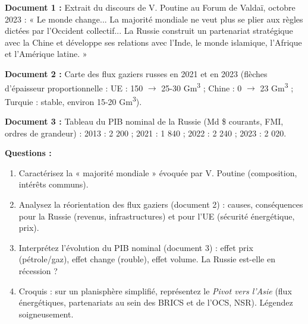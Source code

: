 \documentclass[11pt]{article}
\begin{document}
\begin{exercice}
\textbf{Document 1 :} Extrait du discours de V. Poutine au Forum de Valdaï, octobre 2023 : « Le monde change... La majorité mondiale ne veut plus se plier aux règles dictées par l'Occident collectif... La Russie construit un partenariat stratégique avec la Chine et développe ses relations avec l'Inde, le monde islamique, l'Afrique et l'Amérique latine. »

\textbf{Document 2 :} Carte des flux gaziers russes en 2021 et en 2023 (flèches d'épaisseur proportionnelle : UE : 150 $\rightarrow$ 25-30 Gm\textsuperscript{3} ; Chine : 0 $\rightarrow$ 23 Gm\textsuperscript{3} ; Turquie : stable, environ 15-20 Gm\textsuperscript{3}).

\textbf{Document 3 :} Tableau du PIB nominal de la Russie (Md \$ courants, FMI, ordres de grandeur) : 2013 : 2 200 ; 2021 : 1 840 ; 2022 : 2 240 ; 2023 : 2 020.

\textbf{Questions :}
\begin{enumerate}
    \item Caractérisez la « majorité mondiale » évoquée par V. Poutine (composition, intérêts communs).
    \item Analysez la réorientation des flux gaziers (document 2) : causes, conséquences pour la Russie (revenus, infrastructures) et pour l'UE (sécurité énergétique, prix).
    \item Interprétez l'évolution du PIB nominal (document 3) : effet prix (pétrole/gaz), effet change (rouble), effet volume. La Russie est-elle en récession ?
    \item Croquis : sur un planisphère simplifié, représentez le \emph{Pivot vers l'Asie} (flux énergétiques, partenariats au sein des BRICS et de l'OCS, NSR). Légendez soigneusement.
\end{enumerate}
\end{exercice}
\end{document}
